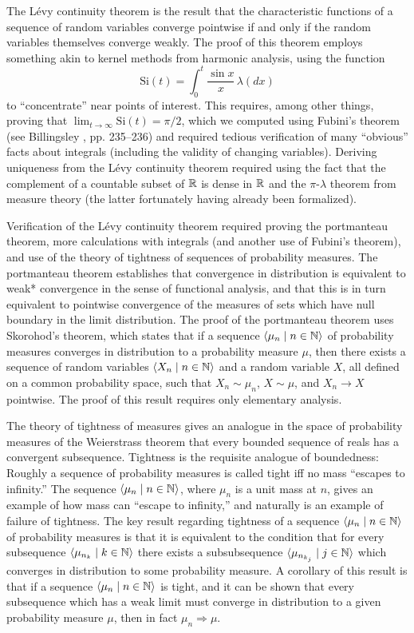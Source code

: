 \documentclass[leqno]{article}
\theoremstyle{definition}
\newcommand{\bldseq}[2]{\langle{#1}\mid{#2}\rangle}
\newcommand\Si{\text{Si}}
\begin{document}
The L\'evy continuity theorem is the result that the characteristic functions of a sequence of random variables converge pointwise if and only if the random variables themselves converge weakly. The proof of this theorem employs something akin to kernel methods from harmonic analysis, using the function
\[ \Si(t) = \int_0^t \frac{\sin x}{x} \, \lambda(dx) \]
to ``concentrate'' near points of interest. This requires, among other things, proving that $\lim_{t \rightarrow \infty} \Si(t) = \pi/2$, which we computed using Fubini's theorem (see Billingsley \cite{billingsley}, pp. 235--236) and required tedious verification of many ``obvious'' facts about integrals (including the validity of changing variables). Deriving uniqueness from the L\'evy continuity theorem required using the fact that the complement of a countable subset of $\mathbb{R}$ is dense in $\mathbb{R}$ and the $\pi$-$\lambda$ theorem from measure theory (the latter fortunately having already been formalized).

Verification of the L\'evy continuity theorem required proving the portmanteau theorem, more calculations with integrals (and another use of Fubini's theorem), and use of the theory of tightness of sequences of probability measures. The portmanteau theorem establishes that convergence in distribution is equivalent to weak* convergence in the sense of functional analysis, and that this is in turn equivalent to pointwise convergence of the measures of sets which have null boundary in the limit distribution. The proof of the portmanteau theorem uses Skorohod's theorem, which states that if a sequence $\bldseq{\mu_n}{n \in \N}$ of probability measures converges in distribution to a probability measure $\mu$, then there exists a sequence of random variables $\bldseq{X_n}{n \in \N}$ and a random variable $X$, all defined on a common probability space, such that $X_n \sim \mu_n$, $X \sim \mu$, and $X_n \rightarrow X$ pointwise. The proof of this result requires only elementary analysis.

The theory of tightness of measures gives an analogue in the space of probability measures of the Weierstrass theorem that every bounded sequence of reals has a convergent subsequence. Tightness is the requisite analogue of boundedness: Roughly a sequence of probability measures is called tight iff no mass ``escapes to infinity.'' The sequence $\bldseq{\mu_n}{n \in \N}$, where $\mu_n$ is a unit mass at $n$, gives an example of how mass can ``escape to infinity,'' and naturally is an example of failure of tightness. The key result regarding tightness of a sequence $\bldseq{\mu_n}{n \in \N}$ of probability measures is that it is equivalent to the condition that for every subsequence $\bldseq{\mu_{n_k}}{k \in \N}$ there exists a subsubsequence $\bldseq{\mu_{n_{k_j}}}{j \in \N}$ which converges in distribution to some probability measure. A corollary of this result is that if a sequence $\bldseq{\mu_n}{n \in \N}$ is tight, and it can be shown that every subsequence which has a weak limit must converge in distribution to a given probability measure $\mu$, then in fact $\mu_n \Rightarrow \mu$.
\end{document}
